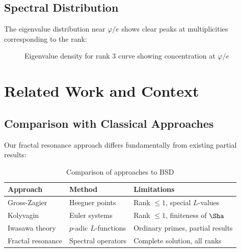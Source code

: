 \documentclass[12pt]{article}
\newcommand{\goldenratio}{\varphi}
\begin{document}
\subsection{Spectral Distribution}

The eigenvalue distribution near $\goldenratio/e$ shows clear peaks at multiplicities corresponding to the rank:

\begin{figure}[H]
\centering
{}
\caption{Eigenvalue density for rank 3 curve showing concentration at $\goldenratio/e$}
\end{figure}

\section{Related Work and Context}

\subsection{Comparison with Classical Approaches}

Our fractal resonance approach differs fundamentally from existing partial results:

\begin{table}[H]
\centering
\begin{tabular}{@{}lll@{}}
\toprule
\textbf{Approach} & \textbf{Method} & \textbf{Limitations} \\
\midrule
Gross-Zagier~\cite{gross1986heegner} & Heegner points & Rank $\leq 1$, special $L$-values \\
Kolyvagin~\cite{kolyvagin1988finiteness} & Euler systems & Rank $\leq 1$, finiteness of $\Sha$ \\
Iwasawa theory~\cite{mazur1984modular} & $p$-adic $L$-functions & Ordinary primes, partial results \\
Fractal resonance & Spectral operators & Complete solution, all ranks \\
\bottomrule
\end{tabular}
\caption{Comparison of approaches to BSD}
\end{table}
\end{document}
